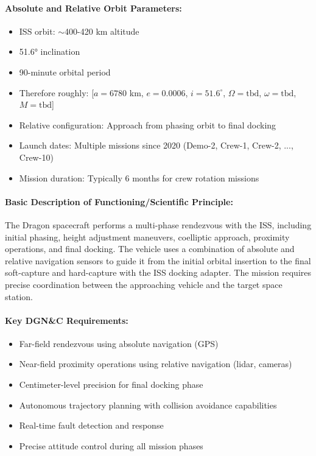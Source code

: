 \paragraph{Absolute and Relative Orbit Parameters:}
\begin{itemize}
    \item ISS orbit: $\sim$400-420 km altitude
    \item 51.6° inclination
    \item 90-minute orbital period
    \item Therefore roughly: [$a = 6780$ km, $e = 0.0006$, $i = 51.6^{\circ}$, $\Omega = \text{tbd}$, $\omega = \text{tbd}$, $M = \text{tbd}$]
    \item Relative configuration: Approach from phasing orbit to final docking
    \item Launch dates: Multiple missions since 2020 (Demo-2, Crew-1, Crew-2, ..., Crew-10)
    \item Mission duration: Typically 6 months for crew rotation missions
\end{itemize}

\paragraph{Basic Description of Functioning/Scientific Principle:}
The Dragon spacecraft performs a multi-phase rendezvous with the ISS, including initial phasing, height adjustment maneuvers, coelliptic approach, proximity operations, and final docking. The vehicle uses a combination of absolute and relative navigation sensors to guide it from the initial orbital insertion to the final soft-capture and hard-capture with the ISS docking adapter. The mission requires precise coordination between the approaching vehicle and the target space station.

\paragraph{Key DGN\&C Requirements:}
\begin{itemize}
    \item Far-field rendezvous using absolute navigation (GPS)
    \item Near-field proximity operations using relative navigation (lidar, cameras)
    \item Centimeter-level precision for final docking phase
    \item Autonomous trajectory planning with collision avoidance capabilities
    \item Real-time fault detection and response
    \item Precise attitude control during all mission phases
\end{itemize}

